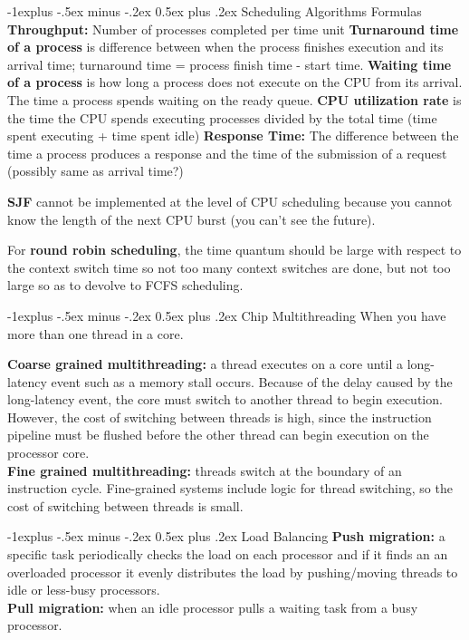 \documentclass[letterpaper, 8pt]{extarticle}
\makeatletter
\renewcommand{\subsection}{\@startsection{subsection}{2}{0mm}%
                                {-1explus -.5ex minus -.2ex}%
                                {0.5ex plus .2ex}%
                                {\normalfont\small\bfseries}}
\makeatother
\begin{document}
\begin{multicols*}{6}
    \subsection{Scheduling Algorithms Formulas}
    \textbf{Throughput:} Number of processes completed per time unit
    \textbf{Turnaround time of a process} is difference between when
    the process finishes execution and its arrival time;
    turnaround time = process finish time - start time.
    \textbf{Waiting time of a process} is how long a process does not execute
    on the CPU from its arrival. The time a process spends waiting on the
    ready queue.
    \textbf{CPU utilization rate} is the time the CPU spends executing
    processes divided by the total time (time spent executing + time spent idle)
    \textbf{Response Time:} The difference between the time a process
    produces a response and the time of the submission of a request
    (possibly same as arrival time?)

    \textbf{SJF} cannot be implemented at the level of CPU scheduling because
    you cannot know the length of the next CPU burst (you can't see the future).

    For \textbf{round robin scheduling}, the time quantum should be large
    with respect to the context switch time so not too many context switches
    are done, but not too large so as to devolve to FCFS scheduling.

    \subsection{Chip Multithreading}
    When you have more than one thread in a core.

    \textbf{Coarse grained multithreading:} a thread executes on a core until a
    long-latency event such as a memory stall occurs. Because of the delay
    caused by the long-latency event, the core must switch to another thread to
    begin execution. However, the cost of switching between threads is high,
    since the instruction pipeline must be flushed before the other thread can
    begin execution on the processor core. \\
    \textbf{Fine grained multithreading:} threads switch at the boundary of
    an instruction cycle. Fine-grained systems include logic
    for thread switching, so the cost of switching between threads is small.

    \subsection{Load Balancing}
    \textbf{Push migration:} a specific task periodically checks the
    load on each processor and if it finds an an overloaded processor it
    evenly distributes the load by pushing/moving threads to idle or less-busy
    processors.\\
    \textbf{Pull migration:} when an idle processor pulls a waiting task
    from a busy processor.


\end{multicols*}
\end{document}
